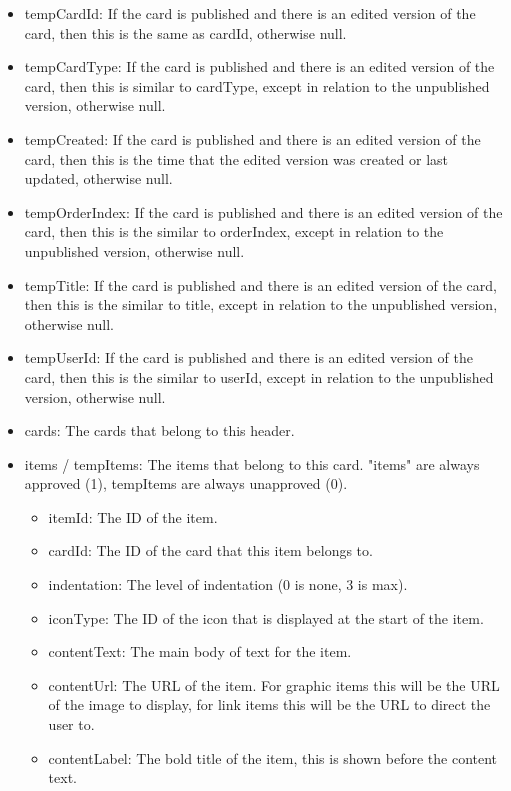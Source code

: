 \documentclass[onecolumn, draftclsnofoot,10pt, compsoc, usenames, dvipsnames]{IEEEtran}
\begin{document}
\begin{itemize}
\begin{itemize}
\begin{itemize}
                \item tempCardId: If the card is published and there is an edited version of the card, then this is the same as cardId, otherwise null.
                \item tempCardType: If the card is published and there is an edited version of the card, then this is similar to cardType, except in relation to the unpublished version, otherwise null.
                \item tempCreated: If the card is published and there is an edited version of the card, then this is the time that the edited version was created or last updated, otherwise null.
                \item tempOrderIndex: If the card is published and there is an edited version of the card, then this is the similar to orderIndex, except in relation to the unpublished version, otherwise null.
                \item tempTitle: If the card is published and there is an edited version of the card, then this is the similar to title, except in relation to the unpublished version, otherwise null.
                \item tempUserId: If the card is published and there is an edited version of the card, then this is the similar to userId, except in relation to the unpublished version, otherwise null.
                \item cards: The cards that belong to this header.
                \item items / tempItems: The items that belong to this card. "items" are always approved (1), tempItems are always unapproved (0).
                \begin{itemize}
                    \item itemId: The ID of the item.
                    \item cardId: The ID of the card that this item belongs to.
                    \item indentation: The level of indentation (0 is none, 3 is max).
                    \item iconType: The ID of the icon that is displayed at the start of the item.
                    \item contentText: The main body of text for the item.
                    \item contentUrl: The URL of the item. For graphic items this will be the URL of the image to display, for link items this will be the URL to direct the user to.
                    \item contentLabel: The bold title of the item, this is shown before the content text.

\end{itemize}
\end{itemize}
\end{itemize}
\end{itemize}
\end{document}
